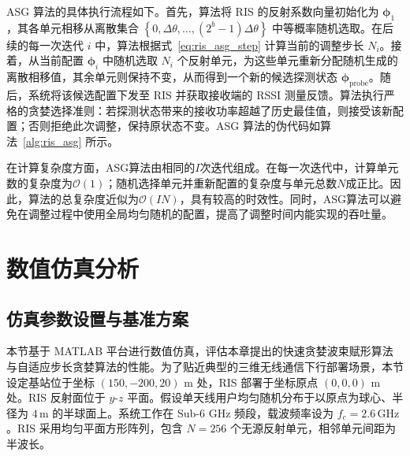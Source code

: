 ASG 算法的具体执行流程如下。首先，算法将 RIS 的反射系数向量初始化为 $\bm{\phi}_1$，其各单元相移从离散集合 $\left\{ 0, \Delta\theta, \dots, (2^b - 1)\Delta\theta \right\}$ 中等概率随机选取。在后续的每一次迭代 $i$ 中，算法根据式~\eqref{eq:ris_asg_step} 计算当前的调整步长 $N_i$。接着，从当前配置 $\bm{\phi}_i$ 中随机选取 $N_i$ 个反射单元，为这些单元重新分配随机生成的离散相移值，其余单元则保持不变，从而得到一个新的候选探测状态 $\bm{\phi}_{\text{probe}}$。随后，系统将该候选配置下发至 RIS 并获取接收端的 RSSI 测量反馈。算法执行严格的贪婪选择准则：若探测状态带来的接收功率超越了历史最佳值，则接受该新配置；否则拒绝此次调整，保持原状态不变。ASG 算法的伪代码如算法~\ref{alg:ris_asg} 所示。

在计算复杂度方面，ASG算法由相同的$I$次迭代组成。在每一次迭代中，计算单元数的复杂度为$\mathcal{O}(1)$；随机选择单元并重新配置的复杂度与单元总数$N$成正比。因此，算法的总复杂度近似为$\mathcal{O}(IN)$，具有较高的时效性。同时，ASG算法可以避免在调整过程中使用全局均匀随机的配置，提高了调整时间内能实现的吞吐量。


\section{数值仿真分析}\label{sec:ris_sim}

\subsection{仿真参数设置与基准方案}

本节基于 MATLAB 平台进行数值仿真，评估本章提出的快速贪婪波束赋形算法与自适应步长贪婪算法的性能。为了贴近典型的三维无线通信下行部署场景，本节设定基站位于坐标 $(150, -200, 20) \text{ m}$ 处，RIS 部署于坐标原点 $(0,0,0) \text{ m}$ 处。RIS 反射面位于 $y$-$z$ 平面。假设单天线用户均匀随机分布于以原点为球心、半径为 $4\,\text{m}$ 的半球面上。系统工作在 Sub-6 GHz 频段，载波频率设为 $f_c = 2.6\,\text{GHz}$。RIS 采用均匀平面方形阵列，包含 $N = 256$ 个无源反射单元，相邻单元间距为半波长。

